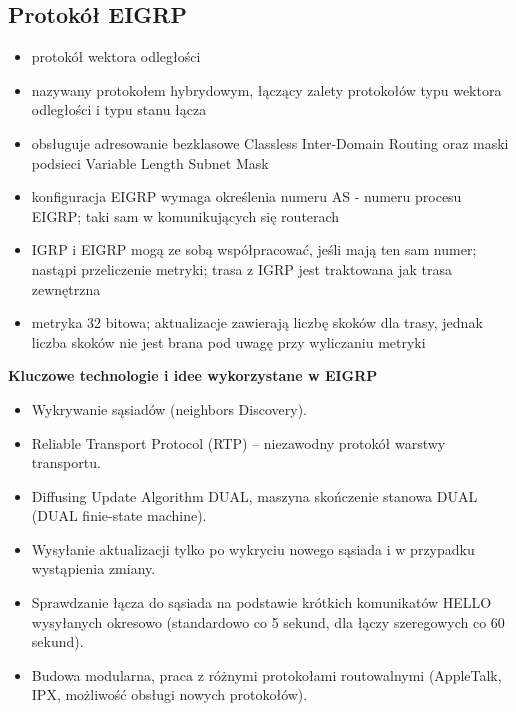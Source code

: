 \documentclass[../main.tex]{subfiles}
\begin{document}
    \subsection{Protokół EIGRP}
    \begin{itemize}
        \item protokół wektora odległości
        \item nazywany protokołem hybrydowym, łączący zalety protokołów typu wektora odległości i
        typu stanu łącza
        \item obsługuje adresowanie bezklasowe Classless Inter-Domain Routing oraz maski
        podsieci Variable Length Subnet Mask
        \item konfiguracja EIGRP wymaga określenia numeru AS - numeru procesu EIGRP; taki sam w komunikujących
        się routerach
        \item IGRP i EIGRP mogą ze sobą współpracować, jeśli mają ten sam numer; nastąpi przeliczenie metryki;
        trasa z IGRP jest traktowana jak trasa zewnętrzna
        \item metryka 32 bitowa; aktualizacje zawierają liczbę skoków dla
        trasy, jednak liczba skoków nie jest brana pod uwagę przy wyliczaniu metryki
    \end{itemize}


    \textbf{Kluczowe technologie i idee wykorzystane w EIGRP}
    \begin{itemize}
        \item Wykrywanie sąsiadów (neighbors Discovery).
        \item Reliable Transport Protocol (RTP) – niezawodny protokół warstwy transportu.
        \item Diffusing Update Algorithm DUAL, maszyna skończenie stanowa DUAL (DUAL finie-state
        machine).
        \item Wysyłanie aktualizacji tylko po wykryciu nowego sąsiada i w przypadku wystąpienia
        zmiany.
        \item Sprawdzanie łącza do sąsiada na podstawie krótkich komunikatów HELLO wysyłanych
        okresowo (standardowo co 5 sekund, dla łączy szeregowych co 60 sekund).
        \item Budowa modularna, praca z różnymi protokołami routowalnymi (AppleTalk, IPX,
        możliwość obsługi nowych protokołów).
    \end{itemize}
\end{document}

